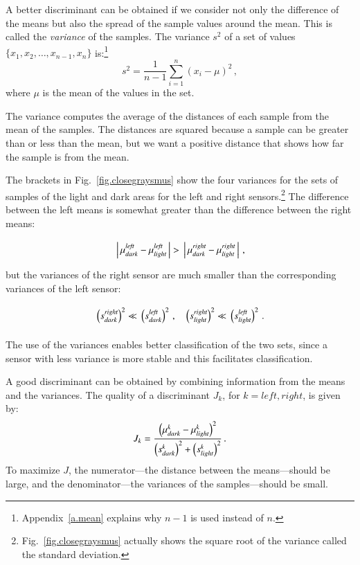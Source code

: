 A better discriminant can be obtained if we consider not only the difference of the means but also the spread of the sample values around the mean. This is called the \emph{variance} of the samples. The variance $s^2$ of a set of values $\{x_1,x_2,\ldots,x_{n-1},x_n\}$ is:\footnote{Appendix~\ref{a.mean} explains why $n-1$ is used instead of $n$.}
\[
s^2 = \frac{1}{n-1} \sum_{i=1}^n (x_i-\mu)^2\,,
\]
where $\mu$ is the mean of the values in the set.

The variance computes the average of the distances of each sample from the mean of the samples. The distances are squared because a sample can be greater than or less than the mean, but we want a positive distance that shows how far the sample is from the mean.

The brackets in Fig.~\ref{fig.closegraysmus} show the four variances for the sets of samples of the light and dark areas for the left and right sensors.\footnote{Fig.~\ref{fig.closegraysmus} actually shows the square root of the variance called the standard deviation.} The difference between the left means is somewhat greater than the difference between the right means:
\[
\rule[-2ex]{0pt}{6ex}\left|\,\mu_{\sub{dark}}^{\sub{left}}-\mu_{\sub{light}}^{\sub{left}}\,\right| > \rule[-2ex]{0pt}{6ex}\left|\,\mu_{\sub{dark}}^{\sub{right}}-\mu_{\sub{light}}^{\sub{right}}\,\right|\,,
\]
but the variances of the right sensor are much smaller than the corresponding variances of the left sensor:
\[
\rule[-2ex]{0pt}{6ex}\left(s_{\sub{dark}}^{\sub{right}}\right)^2
\ll
\rule[-3ex]{0pt}{6ex}\left(s_{\sub{dark}}^{\sub{left}}\right)^2\,,\;\;\;
\rule[-2ex]{0pt}{6ex}\left(s_{\sub{light}}^{\sub{right}}\right)^2
\ll
\rule[-3ex]{0pt}{6ex}\left(s_{\sub{light}}^{\sub{left}}\right)^2\,.
\]
The use of the variances enables better classification of the two sets, since a sensor with less variance is more stable and this facilitates classification.

A good discriminant can be obtained by combining information from the means and the variances. The quality of a discriminant $J_k$, for $k=\mathit{left},\mathit{right}$, is given by:
\begin{equation}
J_k = \frac{\left(\mu_{\textit{\scriptsize dark}}^k - \mu_{\textit{\scriptsize light}}^k\right)^2}{\left(s_{\textit{\scriptsize dark}}^k\right)^2 + \left(s_{\textit{\scriptsize light}}^k\right)^2}\,.\label{eq.j}
\end{equation}
To maximize $J$, the numerator---the distance between the means---should be large, and the denominator---the variances of the samples---should be small.

